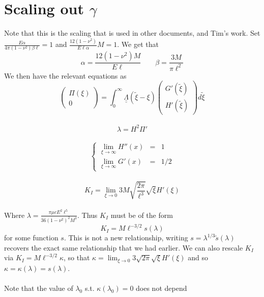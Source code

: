 \documentclass{article}
\begin{document}
\section{Scaling out $\gamma$}
Note that this is the scaling that is used in other documents, and Tim's
work.
Set $\displaystyle \frac{E\alpha}{4\pi (1-\nu^2)\beta \ell} =1$ 
and $\displaystyle \frac{12(1-\nu^2)}{E \ell \alpha}M=1 $. We get that
\[ \alpha = \frac{12(1-\nu^2)M}{E\ell} \qquad \beta = \frac{3M}{\pi \ell^2} \]
We then have the relevant equations as 
\\
\begin{equation}
 \left( \begin{array}{c} \Pi(\xi) \\ 0 \end{array} \right) =
\int_0^{\infty} 
\underline{\underline{\Lambda}}(\tilde{\xi}- \xi) 
\left( \begin{array}{c} G'(\tilde{\xi}) \\[4pt] H'(\tilde{\xi}) \end{array} 
\right) d\tilde{\xi}
\end{equation}
\\
\begin{equation}
\lambda = H^2 \Pi'
\end{equation}
\\
\begin{equation}
\left\{ \begin{array}{ccc}
\displaystyle \lim_{\xi\to\infty} H''(x) & = & 1 \\
\displaystyle \lim_{\xi\to\infty} G'(x) & = & 1/2  
\end{array} \right.
\end{equation}
\\
\begin{equation}
K_I = \lim_{\xi\to 0} 3M \sqrt{\frac{2\pi}{\ell^3}} 
\sqrt{\xi} H'(\xi)
\end{equation}
\\
Where $\lambda = \frac{\pi \mu c E^2 \ell^5}{36(1-\nu^2)^2 M^3}$. 
Thus $K_I$ must be of the form
\[K_I = M\ell^{-3/2} s(\lambda) \]
for some function $s$. This is not a new relationship, writing 
$s = \lambda^{1/3} \tilde{s}(\lambda)$ recovers the exact same relationship
that we had earlier.
We can also rescale $K_I$ via $K_I = M\ell^{-3/2} \kappa$, so that 
$\displaystyle \kappa = \lim_{\xi \to 0} 3\sqrt{2\pi} \sqrt{\xi}H'(\xi) $
and so $\kappa = \kappa(\lambda)=s(\lambda)$.
\\
\\
Note that the value of $\lambda_0$ s.t. $\kappa(\lambda_0)=0$ does not depend
\end{document}
